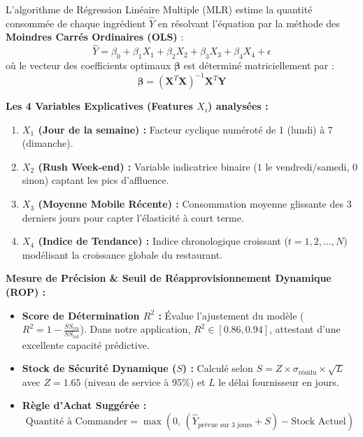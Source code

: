 \documentclass[10pt,a4paper]{article}
\begin{document}
\begin{highlightbox}
L'algorithme de Régression Linéaire Multiple (MLR) estime la quantité consommée de chaque ingrédient $\hat{Y}$ en résolvant l'équation par la méthode des \textbf{Moindres Carrés Ordinaires (OLS)} :
\begin{equation*}
    \hat{Y} = \beta_0 + \beta_1 X_1 + \beta_2 X_2 + \beta_3 X_3 + \beta_4 X_4 + \epsilon
\end{equation*}
où le vecteur des coefficients optimaux $\boldsymbol{\beta}$ est déterminé matriciellement par :
\begin{equation*}
    \boldsymbol{\beta} = (\mathbf{X}^T \mathbf{X})^{-1} \mathbf{X}^T \mathbf{Y}
\end{equation*}
\end{highlightbox}

\vspace{-4pt}
\noindent\textbf{Les 4 Variables Explicatives (Features $X_i$) analysées :}
\begin{enumerate}[itemsep=1pt,leftmargin=*]
    \item \textbf{$X_1$ (Jour de la semaine) :} Facteur cyclique numéroté de 1 (lundi) à 7 (dimanche).
    \item \textbf{$X_2$ (Rush Week-end) :} Variable indicatrice binaire ($1$ le vendredi/samedi, $0$ sinon) captant les pics d'affluence.
    \item \textbf{$X_3$ (Moyenne Mobile Récente) :} Consommation moyenne glissante des 3 derniers jours pour capter l'élasticité à court terme.
    \item \textbf{$X_4$ (Indice de Tendance) :} Indice chronologique croissant ($t = 1, 2, \dots, N$) modélisant la croissance globale du restaurant.
\end{enumerate}

\noindent\textbf{Mesure de Précision \& Seuil de Réapprovisionnement Dynamique (ROP) :}
\begin{itemize}[itemsep=1pt,leftmargin=*]
    \item \textbf{Score de Détermination $R^2$ :} Évalue l'ajustement du modèle ($R^2 = 1 - \frac{SS_{\text{res}}}{SS_{\text{tot}}}$). Dans notre application, $R^2 \in [0.86, 0.94]$, attestant d'une excellente capacité prédictive.
    \item \textbf{Stock de Sécurité Dynamique ($S$) :} Calculé selon $S = Z \times \sigma_{\text{résidu}} \times \sqrt{L}$ avec $Z = 1.65$ (niveau de service à 95\%) et $L$ le délai fournisseur en jours.
    \item \textbf{Règle d'Achat Suggérée :}
    \begin{equation*}
        \text{Quantité à Commander} = \max\left(0, \, (\hat{Y}_{\text{prévue sur 3 jours}} + S) - \text{Stock Actuel}\right)
    \end{equation*}
\end{itemize}
\end{document}

